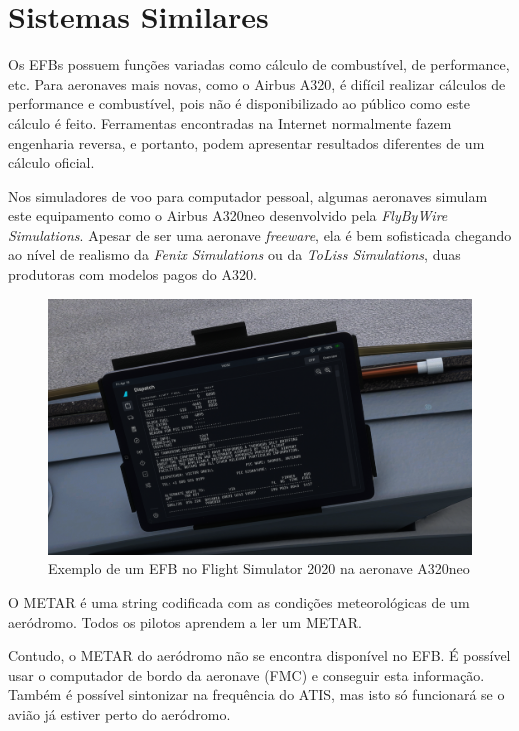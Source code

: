 \chapter{Sistemas Similares}
Os EFBs possuem funções variadas como cálculo de combustível, de performance, etc.
Para aeronaves mais novas, como o Airbus A320, é difícil realizar cálculos
de performance e combustível, pois não é disponibilizado ao público como este cálculo é
feito. Ferramentas encontradas na Internet \cite{a320-perf} normalmente fazem engenharia
reversa, e portanto, podem apresentar resultados diferentes de um cálculo
oficial.

Nos simuladores de voo para computador pessoal, algumas aeronaves
simulam este equipamento como o Airbus A320neo desenvolvido pela
\textit{FlyByWire Simulations}. Apesar de ser uma aeronave \textit{freeware}, ela 
é bem sofisticada chegando ao nível de realismo da \textit{Fenix Simulations}
ou da \textit{ToLiss Simulations}, duas produtoras com modelos pagos do A320.

\begin{figure}[ht]
    \begin{center}
    \includegraphics[width=400pt]{img/efb-a320.png}
    \caption{Exemplo de um EFB no Flight Simulator 2020 na aeronave A320neo}
    \label{fig:efb-a320}
    \end{center}
\end{figure}

O METAR é uma string codificada com as condições meteorológicas de um aeródromo.
Todos os pilotos aprendem a ler um METAR.

Contudo, o METAR do aeródromo não se encontra disponível no EFB.
É possível usar o computador de bordo da aeronave (FMC) e conseguir
esta informação. Também é possível sintonizar na frequência do ATIS,
mas isto só funcionará se o avião já estiver perto do aeródromo.

